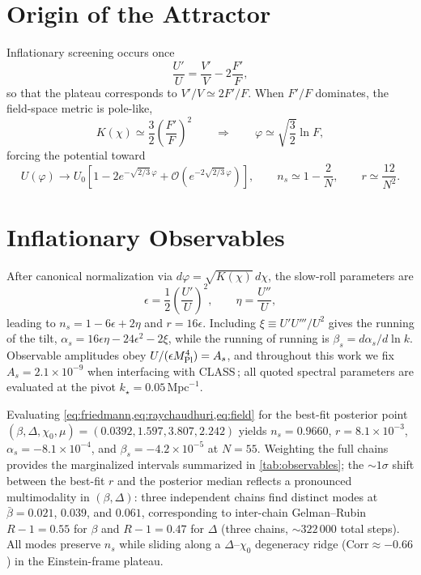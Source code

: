 \documentclass[11pt,a4paper]{article}
\begin{document}
\section{Origin of the Attractor}
\label{sec:origin}
Inflationary screening occurs once
\begin{equation}
\frac{U'}{U}=\frac{V'}{V}-2\frac{F'}{F},
\end{equation}
so that the plateau corresponds to $V'/V\simeq2F'/F$. When $F'/F$ dominates, the field-space metric is pole-like,
\begin{equation}
K(\chi)\simeq\frac{3}{2}\left(\frac{F'}{F}\right)^{2}\qquad\Rightarrow\qquad \varphi\simeq\sqrt{\frac{3}{2}}\ln F,
\end{equation}
forcing the potential toward
\begin{equation}
U(\varphi)\rightarrow U_{0}\left[1-2e^{-\sqrt{2/3}\,\varphi}+\mathcal{O}(e^{-2\sqrt{2/3}\,\varphi})\right], \qquad n_{s}\simeq1-\frac{2}{N}, \qquad r\simeq\frac{12}{N^{2}}.
\end{equation}

\section{Inflationary Observables}
\label{sec:observables}
After canonical normalization via $d\varphi=\sqrt{K(\chi)}\,d\chi$, the slow-roll parameters are
\begin{equation}
\epsilon=\frac{1}{2}\left(\frac{U'}{U}\right)^{2}, \qquad \eta=\frac{U''}{U},
\end{equation}
leading to $n_{s}=1-6\epsilon+2\eta$ and $r=16\epsilon$. Including $\xi \equiv U'U'''/U^{2}$ gives the running of the tilt, $\alpha_{s}=16\epsilon\eta-24\epsilon^{2}-2\xi$, while the running of running is $\beta_{s}=d\alpha_{s}/d\ln k$. Observable amplitudes obey $U/(\epsilon M_{\rm Pl}^{4})=A_{s}$, and throughout this work we fix $A_{s}=2.1\times10^{-9}$ when interfacing with \textsc{CLASS}$\,$; all quoted spectral parameters are evaluated at the pivot $k_{\star}=0.05\,\mathrm{Mpc}^{-1}$.

Evaluating \cref{eq:friedmann,eq:raychaudhuri,eq:field} for the best-fit posterior point $(\beta,\Delta,\chi_{0},\mu)=(0.0392,1.597,3.807,2.242)$ yields $n_s=0.9660$, $r=8.1\times10^{-3}$, $\alpha_s=-8.1\times10^{-4}$, and $\beta_s=-4.2\times10^{-5}$ at $N=55$. Weighting the full chains provides the marginalized intervals summarized in \cref{tab:observables}; the ${\sim}1\sigma$ shift between the best-fit $r$ and the posterior median reflects a pronounced multimodality in $(\beta,\Delta)$: three independent chains find distinct modes at $\bar\beta=0.021$, $0.039$, and $0.061$, corresponding to inter-chain Gelman--Rubin $R{-}1=0.55$ for $\beta$ and $R{-}1=0.47$ for $\Delta$ (three chains, ${\sim}322\,000$ total steps). All modes preserve $n_s$ while sliding along a $\Delta$--$\chi_0$ degeneracy ridge ($\mathrm{Corr}\approx-0.66$) in the Einstein-frame plateau.
\end{document}
